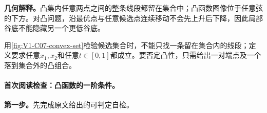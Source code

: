 \documentclass[UTF8,a4paper,11pt,openany]{ctexbook}
\begin{document}
\setcounter{page}{120}
\setcounter{chapter}{7}
\setcounter{figure}{0}
\pagestyle{headings}
\begin{geometrybox}
\textbf{几何解释。}凸集内任意两点之间的整条线段都留在集合中；凸函数图像位于任意弦的下方。对凸问题，沿最优点与任意候选点连续移动不会先上升后下降，因此局部谷底不能隐藏另一个更低谷底。
\end{geometrybox}

用\cref{fig:V1-C07-convex-set}检验候选集合时，不能只找一条留在集合内的线段；定义要求任意$x_1,x_2$和任意$t\in[0,1]$都成立。要否定凸性，只需给出一对端点及一个落到集合外的凸组合。
\paragraph{首次阅读检查：凸函数的一阶条件。}\textbf{第一步。}先完成原文给出的可判定自检。
\end{document}
